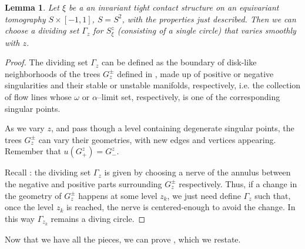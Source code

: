 \documentclass[a4paper, 11pt]{amsart}
\theoremstyle{plain}
\newtheorem{lemma}[lemma]{Lemma}
\theoremstyle{definition}
\begin{document}
\begin{lemma}\label{choosezsmoothdividingset}
	Let $\xi$ be a an invariant tight contact structure on an equivariant tomography $S\times[-1,1]$, $S = S^2$, with the properties just described. Then we can choose a dividing set $\Gamma_z$ for	$S^z_\xi$ (consisting of a single circle) that varies smoothly with $z$.
\end{lemma}
\begin{proof}
	The dividing set $\Gamma_z$ can be defined as the boundary of disk-like neighborhoods of the trees $G_z^{\pm}$ defined in , made up of positive or negative singularities and their stable
	or unstable manifolds, respectively, i.e. the collection of flow lines whose $\omega$ or $\alpha$–limit set, respectively, is one of the corresponding singular points. 
	
	As we vary $z$, and pass though a level containing degenerate singular points, the trees $G^{\pm}_z$ can vary their geometries, with new edges and vertices appearing. Remember that $u(G^z_+) = G^z_-$.
	
	Recall : the dividing set $\Gamma_z$ is given by choosing a nerve of the annulus between the negative and positive parts surrounding $G^\pm_z$ respectively. Thus, if a change in the geometry of $G^\pm_z$ happens at some level $z_k$, we just need define $\Gamma_z$ such that, once the level $z_k$ is reached, the nerve is centered-enough to avoid the change. In this way $\Gamma_{z_k}$ remains a diving circle.
\end{proof}

Now that we have all the pieces, we can prove , which we restate.
\end{document}
